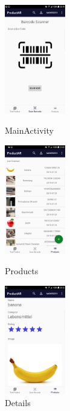 \documentclass{scrartcl}
\begin{document}
\begin{figure}[h]
   \begin{minipage}[b]{.2\linewidth} %
      \includegraphics[width=100px]{img/screenshots/screenshot_1.png}
      \caption{MainActivity}
   \end{minipage}
   \hspace{.1\linewidth}%
   \begin{minipage}[b]{.2\linewidth} %
      \includegraphics[width=100px]{img/screenshots/screenshot_2.png}
      \caption{Products}
   \end{minipage}
   \hspace{.1\linewidth}%
   \begin{minipage}[b]{.2\linewidth} %
      \includegraphics[width=100px]{img/screenshots/screenshot_3.png}
      \caption{Details}
   \end{minipage}
\end{figure}
\end{document}
